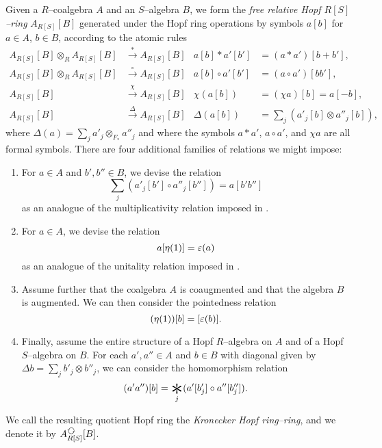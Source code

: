 \begin{definition}\label{DefnAlgebraicModelOfCoopns}
Given a \(R\)--coalgebra \(A\) and an \(S\)--algebra \(B\), we form the \textit{free relative Hopf \(R[S]\)--ring} \(A_{R[S]}[B]\) generated under the Hopf ring operations by symbols \(a[b]\) for \(a \in A\), \(b \in B\), according to the atomic rules
\begin{align*}
A_{R[S]}[B] \otimes_R A_{R[S]}[B] & \xrightarrow{\ast} A_{R[S]}[B] &
a[b] \ast a'[b'] & = (a \ast a') [b + b'], \\
A_{R[S]}[B] \otimes_R A_{R[S]}[B] & \xrightarrow{\circ} A_{R[S]}[B] &
a[b] \circ a'[b'] & = (a \circ a') [b b'], \\
A_{R[S]}[B] & \xrightarrow{\chi} A_{R[S]}[B] &
\chi(a[b]) & = (\chi a)[b] = a[-b], \\
A_{R[S]}[B] & \xrightarrow{\Delta} A_{R[S]}[B] &
\Delta(a[b]) & = \sum_j (a'_j[b] \otimes a''_j[b]),
\end{align*}
where \(\Delta(a) = \sum_j a'_j \otimes_{F_*} a''_j\) and where the symbols \(a \ast a'\), \(a \circ a'\), and \(\chi a\) are all formal symbols.  There are four additional families of relations we might impose:
\begin{enumerate}
    \item For \(a \in A\) and \(b', b'' \in B\), we devise the relation \[\sum_j (a'_j[b'] \circ a''_j[b'']) = a[b'b'']\] as an analogue of the multiplicativity relation imposed in .
    \item For \(a \in A\), we devise the relation \[a[\eta(1)] = \varepsilon(a)\] as an analogue of the unitality relation imposed in .
    \item Assume further that the coalgebra \(A\) is coaugmented and that the algebra \(B\) is augmented.  We can then consider the pointedness relation \[(\eta(1))[b] = [\varepsilon(b)].\]
    \item Finally, assume the entire structure of a Hopf \(R\)--algebra on \(A\) and of a Hopf \(S\)--algebra on \(B\).  For each \(a', a'' \in A\) and \(b \in B\) with diagonal given by \(\Delta b = \sum_j b'_j \otimes b''_j\), we can consider the homomorphism relation \[(a'a'')[b] = \bigast_j (a'[b'_j] \circ a''[b''_j]).\]
\end{enumerate}
We call the resulting quotient Hopf ring the \textit{Kronecker Hopf ring--ring}, and we denote it by \(A_{R[S]}^{\circulatearrows}[B]\).
\end{definition}

